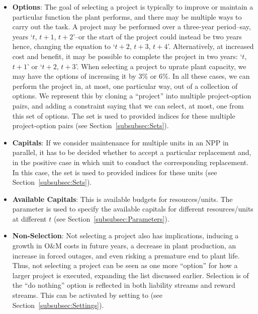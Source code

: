 \begin{itemize}
  \item \textbf{Options}: The goal of selecting a project is typically to improve or maintain
  a particular function the plant performs, and there may be multiple ways to carry out
  the task. A project may be performed over a three-year period--say, years `$t$, $t+1$, $t+2$'--or the
  start of the project could instead be two years hence, changing the equation to
  `$t+2$, $t+3$, $t+4$'. Alternatively, at increased cost and benefit, it may be
  possible to complete the project in two years: `$t$, $t+1$' or `$t+2$, $t+3$'. When selecting a project
  to uprate plant capacity, we may have the options of increasing it by 3\% or 6\%.
  In all these cases, we can perform the project in, at most, one particular way, out of a collection of
  options. We represent this by cloning a “project” into multiple project-option pairs,
  and adding a constraint saying that we can select, at most, one from this set of options.
  The set  is used to provided indices for these multiple project-option pairs
  (see Section~\ref{subsubsec:Sets}).

  \item \textbf{Capitals}: If we consider maintenance for multiple units in an NPP in parallel,
  it has to be decided whether to accept a particular replacement and, in the positive
  case in which unit to conduct the corresponding replacement. In this case, the set 
  is used to provided indices for these units (see Section~\ref{subsubsec:Sets}).

  \item \textbf{Available Capitals}: This is available budgets for resources/units. The parameter
   is used to specify the available capitals for different
  resources/units at different $t$ (see Section~\ref{subsubsec:Parameters}).

  \item \textbf{Non-Selection}: Not selecting a project also has implications, inducing a growth
  in O\&M costs in future years, a decrease in plant production, an increase in forced outages,
  and even risking a premature end to plant life. Thus, not selecting a project can be seen as
  one more “option” for how a larger project is executed, expanding the list discussed earlier.
  Selection is of the “do nothing” option is reflected in both liability streams and reward
  streams. This can be activated by setting  to 
  (see Section~\ref{subsubsec:Settings}).


\end{itemize}
